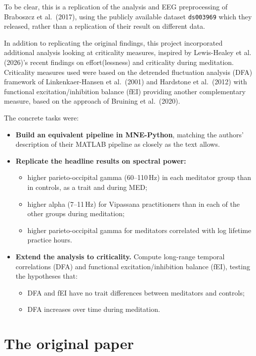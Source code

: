 \documentclass[10pt,a4paper]{article}
\begin{document}
To be clear, this is a replication of the analysis and EEG preprocessing of Braboszcz et al.\ (2017), 
using the publicly available dataset \texttt{ds003969} which they released, rather than a replication of 
their result on different data.

In addition to replicating the original findings, this project incorporated additional analysis looking at 
criticality measures,
inspired by Lewis-Healey et al. (2026)'s recent findings on effort(lessness) and criticality during meditation. 
Criticality measures used were based on the detrended fluctuation analysis (DFA) framework of Linkenkaer-Hansen et al.\ (2001) and Hardstone et al.\ (2012)
with functional excitation/inhibition balance (fEI) providing another complementary measure, based on the
approach of Bruining et al.\ (2020).

The concrete tasks were:
\begin{itemize}
  \item \textbf{Build an equivalent pipeline in MNE-Python}, matching the authors' description of their MATLAB pipeline
       as closely as the text allows.
  \item \textbf{Replicate the headline results on spectral power:}
        \begin{itemize}
          \item higher parieto-occipital gamma (60--110\,Hz) in each meditator group than in controls, as a trait
                and during MED;
          \item higher alpha (7--11\,Hz) for Vipassana practitioners than in each of the other groups during meditation;
          \item higher parieto-occipital gamma for meditators correlated with log lifetime practice hours.
        \end{itemize}
  \item \textbf{Extend the analysis to criticality.} Compute long-range temporal correlations (DFA) and functional
        excitation/inhibition balance (fEI), testing the hypotheses that:
      \begin{itemize}
          \item DFA and fEI have no trait differences between meditators and controls;
          \item DFA increases over time during meditation.
        \end{itemize}
\end{itemize}

\section{The original paper}
\end{document}
